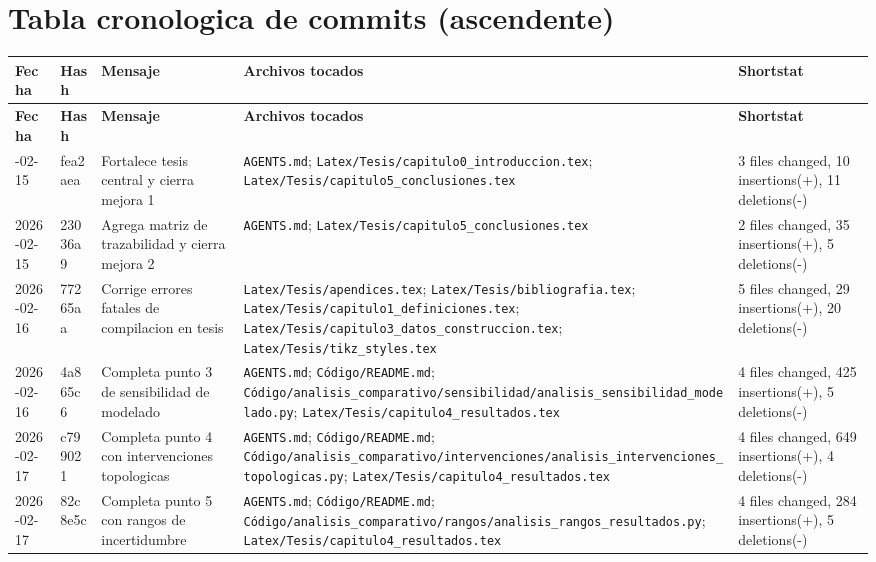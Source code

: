 \documentclass[11pt]{article}
\begin{document}
\section{Tabla cronologica de commits (ascendente)}
\small
\begin{longtable}{L{1.8cm}L{1.5cm}L{3.8cm}L{5.6cm}L{2.8cm}}
\toprule
\textbf{Fecha} & \textbf{Hash} & \textbf{Mensaje} & \textbf{Archivos tocados} & \textbf{Shortstat} \\
\midrule
\endfirsthead
\toprule
\textbf{Fecha} & \textbf{Hash} & \textbf{Mensaje} & \textbf{Archivos tocados} & \textbf{Shortstat} \\
\midrule
\endhead
\bottomrule
{}-02-15 & fea2aea & Fortalece tesis central y cierra mejora 1 &
\texttt{AGENTS.md}; \texttt{Latex/Tesis/capitulo0\_introduccion.tex}; \texttt{Latex/Tesis/capitulo5\_conclusiones.tex} &
3 files changed, 10 insertions(+), 11 deletions(-) \\

2026-02-15 & 23036a9 & Agrega matriz de trazabilidad y cierra mejora 2 &
\texttt{AGENTS.md}; \texttt{Latex/Tesis/capitulo5\_conclusiones.tex} &
2 files changed, 35 insertions(+), 5 deletions(-) \\

2026-02-16 & 77265aa & Corrige errores fatales de compilacion en tesis &
\texttt{Latex/Tesis/apendices.tex}; \texttt{Latex/Tesis/bibliografia.tex}; \texttt{Latex/Tesis/capitulo1\_definiciones.tex}; \texttt{Latex/Tesis/capitulo3\_datos\_construccion.tex}; \texttt{Latex/Tesis/tikz\_styles.tex} &
5 files changed, 29 insertions(+), 20 deletions(-) \\

2026-02-16 & 4a865c6 & Completa punto 3 de sensibilidad de modelado &
\texttt{AGENTS.md}; \texttt{C\'odigo/README.md}; \texttt{C\'odigo/analisis\_comparativo/sensibilidad/analisis\_sensibilidad\_modelado.py}; \texttt{Latex/Tesis/capitulo4\_resultados.tex} &
4 files changed, 425 insertions(+), 5 deletions(-) \\

2026-02-17 & c799021 & Completa punto 4 con intervenciones topologicas &
\texttt{AGENTS.md}; \texttt{C\'odigo/README.md}; \texttt{C\'odigo/analisis\_comparativo/intervenciones/analisis\_intervenciones\_topologicas.py}; \texttt{Latex/Tesis/capitulo4\_resultados.tex} &
4 files changed, 649 insertions(+), 4 deletions(-) \\

2026-02-17 & 82c8e5c & Completa punto 5 con rangos de incertidumbre &
\texttt{AGENTS.md}; \texttt{C\'odigo/README.md}; \texttt{C\'odigo/analisis\_comparativo/rangos/analisis\_rangos\_resultados.py}; \texttt{Latex/Tesis/capitulo4\_resultados.tex} &
4 files changed, 284 insertions(+), 5 deletions(-) \\


\end{longtable}
\end{document}
